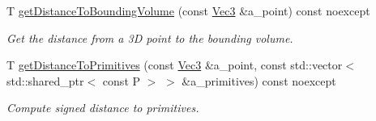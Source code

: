 \begin{DoxyCompactItemize}
T \hyperlink{classBVH_1_1LinearNodeT_a2bf5b1c514a20754d527b17e1c664630}{get\+Distance\+To\+Bounding\+Volume} (const \hyperlink{classBVH_1_1LinearNodeT_a073e87d51d44b4cc243c8f90690247a6}{Vec3} \&a\+\_\+point) const noexcept
\begin{DoxyCompactList}\small\item\em Get the distance from a 3D point to the bounding volume. \end{DoxyCompactList}\item 
T \hyperlink{classBVH_1_1LinearNodeT_a1a0a50ba8c1c0601f12ae02857246b1f}{get\+Distance\+To\+Primitives} (const \hyperlink{classBVH_1_1LinearNodeT_a073e87d51d44b4cc243c8f90690247a6}{Vec3} \&a\+\_\+point, const std\+::vector$<$ std\+::shared\+\_\+ptr$<$ const P $>$ $>$ \&a\+\_\+primitives) const noexcept
\begin{DoxyCompactList}\small\item\em Compute signed distance to primitives. \end{DoxyCompactList}\end{DoxyCompactItemize}

